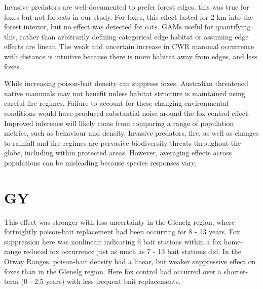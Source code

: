 \documentclass[11pt,a4paper,titlepage,twoside,openright]{style/unimelbthesis}
\begin{document}
\begin{mainmatter}
Invasive predators are well-documented to prefer forest edges, this was true for foxes but not for cats in our study. For foxes, this effect lasted for 2 km into the forest interior, but no effect was detected for cats. GAMs useful for quantifying this, rather than arbitrarily defining categorical edge habitat or assuming edge effects are linear. The weak and uncertain increase in CWR mammal occurrence with distance is intuitive because there is more habitat away from edges, and less foxes.

While increasing poison-bait density can suppress foxes, Australian threatened native mammals may not benefit unless habitat structure is maintained using careful fire regimes. Failure to account for these changing environmental conditions would have produced substantial noise around the fox control effect. Improved inference will likely come from comparing a range of population metrics, such as behaviour and density.
Invasive predators, fire, as well as changes to rainfall and fire regimes are pervasive biodiversity threats throughout the globe, including within protected areas. However, averaging effects across populations can be misleading because species responses vary.

\hypertarget{gy}{%
\section{GY}\label{gy}}

This effect was stronger with less uncertainty in the Glenelg region, where fortnightly poison-bait replacement had been occurring for 8 - 13 years. Fox suppression here was nonlinear: indicating 6 bait stations within a fox home-range reduced fox occurrence just as much as 7 - 13 bait stations did. In the Otway Ranges, poison-bait density had a linear, but weaker suppressive effect on foxes than in the Glenelg region. Here fox control had occurred over a shorter-term (0 - 2.5 years) with less frequent bait replacements.


\end{mainmatter}
\end{document}
